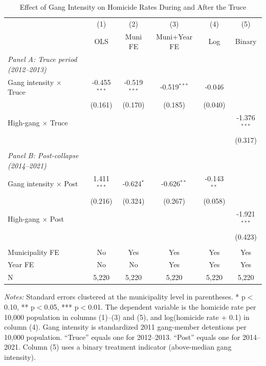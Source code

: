 \begin{table}[H]
\centering
\caption{Effect of Gang Intensity on Homicide Rates During and After the Truce}
\label{tab:main}
\begin{threeparttable}
\footnotesize
\begin{tabular}{lccccc}
\toprule
 & (1) & (2) & (3) & (4) & (5) \\
 & OLS & Muni FE & Muni+Year FE & Log & Binary \\
\midrule
\textit{Panel A: Truce period (2012--2013)} \\
Gang intensity $\times$ Truce & -0.455$^{***}$ & -0.519$^{***}$ & -0.519$^{***}$ & -0.046 & \\
 & (0.161) & (0.170) & (0.185) & (0.040) & \\
High-gang $\times$ Truce & & & & & -1.376$^{***}$ \\
 & & & & & (0.317) \\
\\
\textit{Panel B: Post-collapse (2014--2021)} \\
Gang intensity $\times$ Post & 1.411$^{***}$ & -0.624$^{*}$ & -0.626$^{**}$ & -0.143$^{**}$ & \\
 & (0.216) & (0.324) & (0.267) & (0.058) & \\
High-gang $\times$ Post & & & & & -1.921$^{***}$ \\
 & & & & & (0.423) \\
\\
Municipality FE & No & Yes & Yes & Yes & Yes \\
Year FE & No & No & Yes & Yes & Yes \\
N & 5,220 & 5,220 & 5,220 & 5,220 & 5,220 \\
\bottomrule
\end{tabular}
\begin{tablenotes}[flushleft]
\small
\item \textit{Notes:} Standard errors clustered at the municipality level in parentheses. * p$<$0.10, ** p$<$0.05, *** p$<$0.01. The dependent variable is the homicide rate per 10,000 population in columns (1)--(3) and (5), and log(homicide rate + 0.1) in column (4). Gang intensity is standardized 2011 gang-member detentions per 10,000 population. ``Truce'' equals one for 2012--2013. ``Post'' equals one for 2014--2021. Column (5) uses a binary treatment indicator (above-median gang intensity).
\end{tablenotes}
\end{threeparttable}
\end{table}
